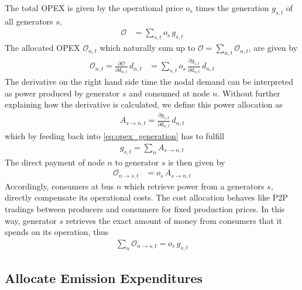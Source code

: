 \documentclass[11pt,twocolumn]{article}
\newcommand{\pdv}[2]{\frac{\partial #1}{\partial #2}}
\newcommand{\generation}{g_{s,t}}
\newcommand{\opexGeneration}{o_{s}}
\newcommand{\demand}[1][n]{d_{#1,t}}
\newcommand{\allocatePeer}[1][s \rightarrow n]{A_{#1,t}}
\newcommand{\allocateOpex}[1][n]{\mathcal{O}_{#1,t}}
\newcommand{\totalOpexGeneration}{\mathcal{O}}
\begin{document}
The total OPEX is given by the operational price $\opexGeneration$ times the generation $\generation$ of all generators $s$, 
\begin{align}
 \totalOpexGeneration& = \sum_{s,t} \opexGeneration\,  \generation 
\label{eq:opex_generation}
 \end{align}
The allocated OPEX $\allocateOpex$ which naturally sum up to $  \totalOpexGeneration = \sum_{n,t} \allocateOpex$, are given by 
\begin{align}
\allocateOpex  = \pdv{\totalOpexGeneration}{\demand} \, \demand & =  \sum_{s,t}\opexGeneration \, \pdv{\generation}{\demand} \, \demand
\end{align}
% 
The derivative on the right hand side time the nodal demand can be interpreted as power produced by generator $s$ and consumed at node $n$. Without further explaining how the derivative is calculated, we define this power allocation as 
\begin{align}
 \allocatePeer = \pdv{\generation}{\demand} \, \demand
 \label{eq:allocate_peer}
\end{align}
% 
which by feeding back into \cref{eq:opex_generation} has to fulfill
\begin{align}
\generation = \sum_n \allocatePeer
\label{eq:allocate_peer_constraint}
\end{align}
% 
% 
The direct payment of node $n$ to generator $s$ is then given by  
% 
\begin{align}
 \allocateOpex[n \rightarrow s] &= 
\opexGeneration \,  \allocatePeer
\label{eq:allocate_opexGeneration_detailed}
\end{align}
Accordingly, consumers at bus $n$ which retrieve power from a generators $s$, directly  compensate its operational costs. The cost allocation behaves like P2P tradings between producers and consumers for fixed production prices. In this way,  generator $s$ retrieves the exact amount of money from consumers that it spends on its operation, thus 
\begin{align}
\sum_{n} \allocateOpex[n \rightarrow s] = \opexGeneration \, \generation
\label{eq:no_profit_opex}
\end{align}

\subsection{Allocate Emission Expenditures}
\end{document}
